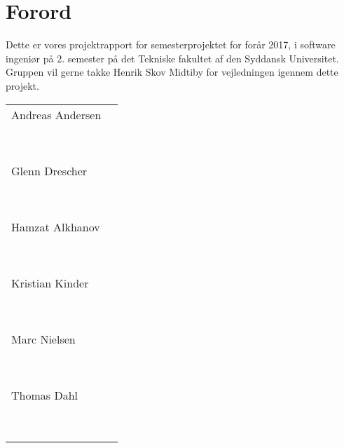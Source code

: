 \newpage
\section{Forord}
Dette er vores projektrapport for semesterprojektet for forår 2017, i software ingeniør på 2. semester på  det Tekniske fakultet af den Syddansk Universitet.
Gruppen vil gerne takke Henrik Skov Midtiby for vejledningen igennem dette projekt.
\vspace{7cm}

\begin{tabular}{l r}
\huge{Andreas Andersen} & \\ & \rule{10cm}{1px} \\ \\ \\

\huge{Glenn Drescher} & \\ & \rule{10cm}{1px} \\ \\ \\

\huge{Hamzat Alkhanov} & \\ & \rule{10cm}{1px}\\ \\ \\

\huge{Kristian Kinder} & \\ & \rule{10cm}{1px}\\ \\ \\

\huge{Marc Nielsen} & \\ & \rule{10cm}{1px}\\ \\ \\

\huge{Thomas Dahl} & \\ & \rule{10cm}{1px}\\ \\ \\

\end{tabular}

